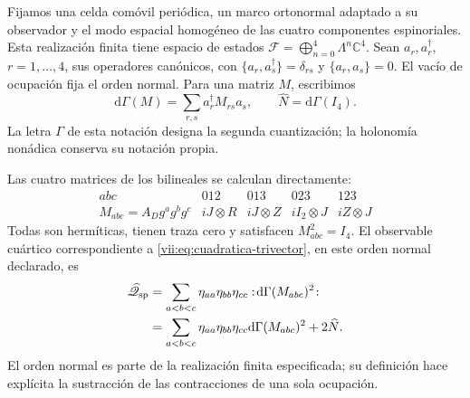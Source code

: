 Fijamos una celda comóvil periódica, un marco ortonormal adaptado a su
observador y el modo espacial homogéneo de las cuatro componentes
espinoriales. Esta realización finita tiene espacio de estados
\(\mathcal F=\bigoplus_{n=0}^4\Lambda^n\mathbb C^4\).
Sean \(a_r,a_r^\dagger\), \(r=1,\ldots,4\), sus operadores
canónicos, con
\(\{a_r,a_s^\dagger\}=\delta_{rs}\) y
\(\{a_r,a_s\}=0\). El vacío de ocupación fija el orden
normal. Para una matriz \(M\), escribimos
\[
 \mathrm d\Gamma(M)=\sum_{r,s}a_r^\dagger M_{rs}a_s,
 \qquad \widehat N=\mathrm d\Gamma(I_4).
\]
La letra \(\Gamma\) de esta notación designa la segunda
cuantización; la holonomía nonádica conserva su notación propia.

Las cuatro matrices de los bilineales se calculan directamente:
\begin{equation}
 \begin{array}{c|cccc}
 abc&012&013&023&123\\ \hline
 M_{abc}=A_Dg^ag^bg^c
       &iJ\otimes R&iJ\otimes Z&iI_2\otimes J&iZ\otimes J
 \end{array}
 \label{vii:eq:matrices-bilineales-espin}
\end{equation}
Todas son hermíticas, tienen traza cero y satisfacen
\(M_{abc}^2=I_4\). El observable cuártico correspondiente a
\eqref{vii:eq:cuadratica-trivector}, en este orden normal declarado,
es
\begin{equation}
 \begin{split}
 \widehat{\mathscr Q}_{\rm sp}
 &=\sum_{a<b<c}\eta_{aa}\eta_{bb}\eta_{cc}
       :\!\mathrm d\Gamma(M_{abc})^2\!:\\
 &=\sum_{a<b<c}\eta_{aa}\eta_{bb}\eta_{cc}
       \mathrm d\Gamma(M_{abc})^2+2\widehat N.
 \end{split}
 \label{vii:eq:observable-cuadratico-espin}
\end{equation}
El orden normal es parte de la realización finita especificada;
su definición hace explícita la sustracción de las contracciones de
una sola ocupación.

